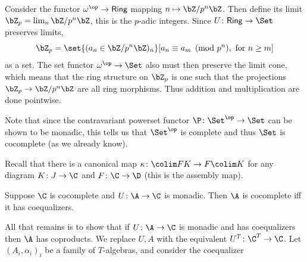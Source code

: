 \ecoro

\bexam

    Consider the functor $\omega^\op\to{\sf Ring}$ mapping $n\mapsto\bZ/p^n\bZ$.
    Then define its limit $\bZ_p=\lim_n\bZ/p^n\bZ$, this is the {\emphcolor $p$-adic integers}.
    Since $U\colon{\sf Ring}\to\Set$ preserves limits,
    $$ \bZ_p = \set{(a_n\in\bZ/p^n\bZ)_n}[a_n\equiv a_m\pmod{p^n},\hbox{ for $n\geq m$}] $$
    as a set.
    The set functor $\omega^\op\to\Set$ also must then preserve the limit cone, which means that the ring structure on $\bZ_p$ is one such that
    the projections $\bZ_p\to\bZ/p^n\bZ$ are all ring morphisms.
    Thus addition and multiplication are done pointwise.

\eexam

Note that since the contravariant powerset functor $\P\colon\Set^\op\to\Set$ can be shown to be monadic, this tells us that $\Set^\op$ is complete and thus
$\Set$ is cocomplete (as we already know).

Recall that there is a canonical map $\kappa\colon\colim FK\to F\colim K$ for any diagram $K\colon J\to\C$ and $F\colon\C\to\D$ (this is the assembly map).

\bprop

    Suppose $\C$ is cocomplete and $U\colon\A\to\C$ is monadic.
    Then $\A$ is cocomplete iff it has coequalizers.

\eprop

\bproof

    All that remains is to show that if $U\colon\A\to\C$ is monadic and has coequalizers then $\A$ has coproducts.
    We replace $U,A$ with the equivalent $U^T\colon\C^T\to\C$.
    Let $(A_i,\alpha_i)_i$ be a family of $T$-algebras, and consider the coequalizer

    \centerline{}

\eproof

